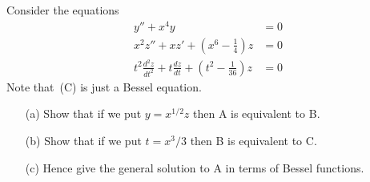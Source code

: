 \documentclass[a4paper]{amsart}
\begin{document}
\begin{exercise}\label{ex-transform-b}
 Consider the equations
 \begin{align*}
  y''+x^4y &= 0 \tag{A} \\
  x^2z'' + xz' + (x^6-\tfrac{1}{4})z &= 0 \tag{B} \\
  t^2\frac{d^2z}{dt^2} + t\frac{dz}{dt} + (t^2 - \tfrac{1}{36}) z &= 0 \tag{C}
 \end{align*}
 Note that~(C) is just a Bessel equation.
 \begin{itemize}
  \item[(a)] Show that if we put $y=x^{1/2}z$ then A is equivalent to B.
  \item[(b)] Show that if we put $t=x^3/3$ then B is equivalent to C.
  \item[(c)] Hence give the general solution to A in terms of Bessel functions.
 \end{itemize}
\end{exercise}
\end{document}

